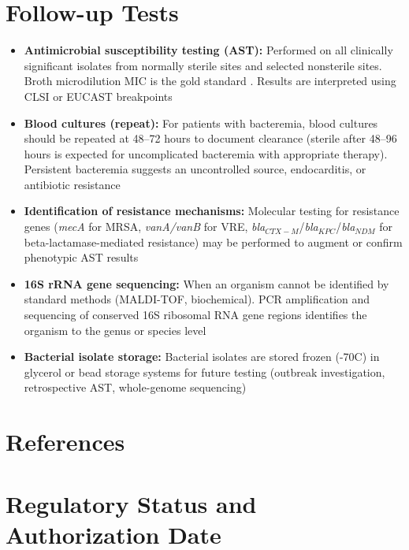 \section*{Follow-up Tests}
\begin{itemize}
  \item \textbf{Antimicrobial susceptibility testing (AST):} Performed on all clinically significant isolates from normally sterile sites and selected nonsterile sites. Broth microdilution MIC is the gold standard \cite{jorgensen2009antimicrobial}. Results are interpreted using CLSI or EUCAST breakpoints
  \item \textbf{Blood cultures (repeat):} For patients with bacteremia, blood cultures should be repeated at 48--72 hours to document clearance (sterile after 48--96 hours is expected for uncomplicated bacteremia with appropriate therapy). Persistent bacteremia suggests an uncontrolled source, endocarditis, or antibiotic resistance
  \item \textbf{Identification of resistance mechanisms:} Molecular testing for resistance genes (\textit{mecA} for MRSA, \textit{vanA/vanB} for VRE, \textit{bla}$_{CTX-M}$/\textit{bla}$_{KPC}$/\textit{bla}$_{NDM}$ for beta-lactamase-mediated resistance) may be performed to augment or confirm phenotypic AST results
  \item \textbf{16S rRNA gene sequencing:} When an organism cannot be identified by standard methods (MALDI-TOF, biochemical). PCR amplification and sequencing of conserved 16S ribosomal RNA gene regions identifies the organism to the genus or species level
  \item \textbf{Bacterial isolate storage:} Bacterial isolates are stored frozen (-70\textdegree{}C) in glycerol or bead storage systems for future testing (outbreak investigation, retrospective AST, whole-genome sequencing)
\end{itemize}

\section*{References}



\clearpage
\section*{Regulatory Status and Authorization Date}

\clearpage
